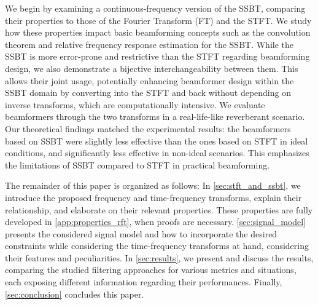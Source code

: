 
We begin by examining a continuous-frequency version of the SSBT, comparing their properties to those of the Fourier Transform (FT) and the STFT. We study how these properties impact basic beamforming concepts such as the convolution theorem and relative frequency response estimation for the SSBT. While the SSBT is more error-prone and restrictive than the STFT regarding beamforming design, we also demonstrate a bijective interchangeability between them. This allows their joint usage, potentially enhancing beamformer design within the SSBT domain by converting into the STFT and back without depending on inverse transforms, which are computationally intensive. We evaluate beamformers through the two transforms in a real-life-like reverberant scenario.
Our theoretical findings matched the experimental results: the beamformers based on SSBT were slightly less effective than the ones based on STFT in ideal conditions, and significantly less effective in non-ideal scenarios. This emphasizes the limitations of SSBT compared to STFT in practical beamforming.


The remainder of this paper is organized as follows: In \cref{sec:stft_and_ssbt}, we introduce the proposed frequency and time-frequency transforms, explain their relationship, and elaborate on their relevant properties. These properties are fully developed in \cref{app:properties_rft}, when proofs are necessary.
\cref{sec:signal_model} presents the considered signal model and how to incorporate the desired constraints while considering the time-frequency transforms at hand, considering their features and peculiarities.
In \cref{sec:results}, we present and discuss the results, comparing the studied filtering approaches for various metrics and situations, each exposing different information regarding their performances.
Finally, \cref{sec:conclusion} concludes this paper.

